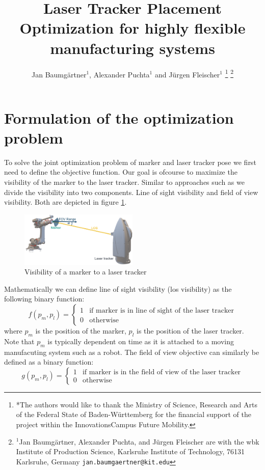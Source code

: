 \documentclass{svproc}
\title{\LARGE \bf
Laser Tracker Placement Optimization for highly flexible manufacturing systems
}
\author{Jan Baumgärtner$^{1}$,  Alexander Puchta$^{1}$ and Jürgen Fleischer$^{1}$%
\thanks{*The authors would like to thank the Ministry of Science, Research and Arts of the Federal State of Baden-Württemberg for the financial support of the project within the InnovationsCampus Future Mobility.
}%
\thanks{$^{1}$Jan Baumgärtner, Alexander Puchta, and Jürgen Fleischer are with the wbk Institute of Production Science,
        Karlsruhe Institute of Technology, 76131 Karlsruhe, Germany
        {\tt\small jan.baumgaertner@kit.edu}}%
}
\begin{document}
\maketitle
\thispagestyle{empty}
\pagestyle{empty}


\section{Formulation of the optimization problem}
To solve the joint optimization problem of marker and laser tracker pose we first need to define the objective function.
Our goal is ofcourse to maximize the visibility of the marker to the laser tracker.
Similar to approaches such as \cite{ieee_sensors} we divide the visibility into two components.
Line of sight visibility and field of view visibility.
Both  are depicted in figure \ref{fig:visibility}.
\begin{figure}
        \centering
        \includegraphics[width=0.5\textwidth]{figures/visibility.png}
        \caption{Visibility of a marker to a laser tracker}
        \label{fig:visibility}
\end{figure}
Mathematically we can define line of sight visibility (los visibility) as the following binary function:
\begin{equation}
    f(p_m,p_l) = \begin{cases}
    1 & \text{if } \text{marker is in line of sight of the laser tracker} \\
    0 & \text{otherwise}
    \end{cases}
\end{equation}
where $p_m$ is the position of the marker, $p_l$ is the position of the laser tracker.
Note that $p_m$ is typically dependent on time as it is attached to a moving manufacuting system such as a robot.
The field of view objective can similarly be defined as a binary function:
\begin{equation}
    g(p_m,p_l) = \begin{cases}
    1 & \text{if } \text{marker is in the field of view of the laser tracker} \\
    0 & \text{otherwise}
    \end{cases}
\end{equation}
\end{document}
